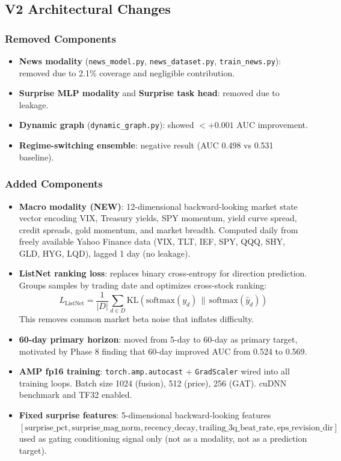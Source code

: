 \documentclass[12pt,a4paper]{article}
\begin{document}
\subsection{V2 Architectural Changes}

\subsubsection{Removed Components}
\begin{itemize}
    \item \textbf{News modality} (\texttt{news\_model.py}, \texttt{news\_dataset.py}, \texttt{train\_news.py}):
          removed due to 2.1\% coverage and negligible contribution.
    \item \textbf{Surprise MLP modality} and \textbf{Surprise task head}: removed due to leakage.
    \item \textbf{Dynamic graph} (\texttt{dynamic\_graph.py}): showed $<+0.001$ AUC improvement.
    \item \textbf{Regime-switching ensemble}: negative result (AUC 0.498 vs 0.531 baseline).
\end{itemize}

\subsubsection{Added Components}
\begin{itemize}
    \item \textbf{Macro modality (NEW)}: 12-dimensional backward-looking market state vector
          encoding VIX, Treasury yields, SPY momentum, yield curve spread, credit spreads,
          gold momentum, and market breadth. Computed daily from freely available Yahoo Finance
          data (\^{V}IX, TLT, IEF, SPY, QQQ, SHY, GLD, HYG, LQD), lagged 1 day (no leakage).
    \item \textbf{ListNet ranking loss}: replaces binary cross-entropy for direction prediction.
          Groups samples by trading date and optimizes cross-stock ranking:
          $$L_{\text{ListNet}} = \frac{1}{|D|}\sum_{d \in D} \text{KL}\!\left(\text{softmax}(y_d) \,\|\, \text{softmax}(\hat{y}_d)\right)$$
          This removes common market beta noise that inflates difficulty.
    \item \textbf{60-day primary horizon}: moved from 5-day to 60-day as primary target,
          motivated by Phase 8 finding that 60-day improved AUC from 0.524 to 0.569.
    \item \textbf{AMP fp16 training}: \texttt{torch.amp.autocast} + \texttt{GradScaler}
          wired into all training loops. Batch size 1024 (fusion), 512 (price), 256 (GAT).
          cuDNN benchmark and TF32 enabled.
    \item \textbf{Fixed surprise features}: 5-dimensional backward-looking features
          $[\text{surprise\_pct}, \text{surprise\_mag\_norm}, \text{recency\_decay},
          \text{trailing\_3q\_beat\_rate}, \text{eps\_revision\_dir}]$ used as gating
          conditioning signal only (not as a modality, not as a prediction target).
\end{itemize}
\end{document}

